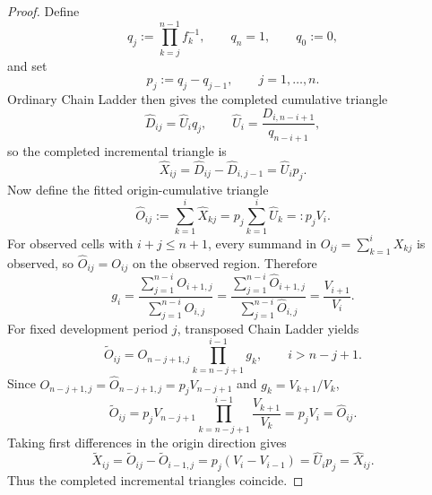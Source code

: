 \documentclass[11pt]{article}
\newcommand{\1}{\mathbf{1}}
\begin{document}
\begin{proof}
Define
\begin{equation}
q_j:=\prod_{k=j}^{n-1}f_k^{-1},
\qquad q_n=1,
\qquad q_0:=0,
\label{eq:qj_cl_def}
\end{equation}
and set
\begin{equation}
p_j:=q_j-q_{j-1},
\qquad j=1,\dots,n.
\label{eq:pj_cl_def}
\end{equation}
Ordinary Chain Ladder then gives the completed cumulative triangle
\begin{equation}
\widehat D_{ij}=\widehat U_i q_j,
\qquad
\widehat U_i=\frac{D_{i,n-i+1}}{q_{n-i+1}},
\label{eq:Dhat_cl}
\end{equation}
so the completed incremental triangle is
\begin{equation}
\widehat X_{ij}=\widehat D_{ij}-\widehat D_{i,j-1}=\widehat U_i p_j.
\label{eq:Xhat_cl_factor}
\end{equation}
Now define the fitted origin-cumulative triangle
\begin{equation}
\widehat O_{ij}:=\sum_{k=1}^{i}\widehat X_{kj}=p_j\sum_{k=1}^{i}\widehat U_k=:p_jV_i.
\label{eq:Ohat_def}
\end{equation}
For observed cells with $i+j\le n+1$, every summand in $O_{ij}=\sum_{k=1}^{i}X_{kj}$ is observed, so $\widehat O_{ij}=O_{ij}$ on the observed region. Therefore
\begin{equation}
g_i
=
\frac{\sum_{j=1}^{n-i}O_{i+1,j}}{\sum_{j=1}^{n-i}O_{i,j}}
=
\frac{\sum_{j=1}^{n-i}\widehat O_{i+1,j}}{\sum_{j=1}^{n-i}\widehat O_{i,j}}
=
\frac{V_{i+1}}{V_i}.
\label{eq:gi_vi}
\end{equation}
For fixed development period $j$, transposed Chain Ladder yields
\begin{equation}
\widetilde O_{ij}=O_{n-j+1,j}\prod_{k=n-j+1}^{i-1}g_k,
\qquad i>n-j+1.
\label{eq:Otilde_transposed_def}
\end{equation}
Since $O_{n-j+1,j}=\widehat O_{n-j+1,j}=p_jV_{n-j+1}$ and $g_k=V_{k+1}/V_k$,
\begin{equation}
\widetilde O_{ij}=p_jV_{n-j+1}\prod_{k=n-j+1}^{i-1}\frac{V_{k+1}}{V_k}=p_jV_i=\widehat O_{ij}.
\label{eq:Otilde_transposed}
\end{equation}
Taking first differences in the origin direction gives
\begin{equation}
\widetilde X_{ij}=\widetilde O_{ij}-\widetilde O_{i-1,j}=p_j(V_i-V_{i-1})=\widehat U_i p_j=\widehat X_{ij}.
\label{eq:transpose_same_incremental}
\end{equation}
Thus the completed incremental triangles coincide.
\end{proof}
\end{document}
